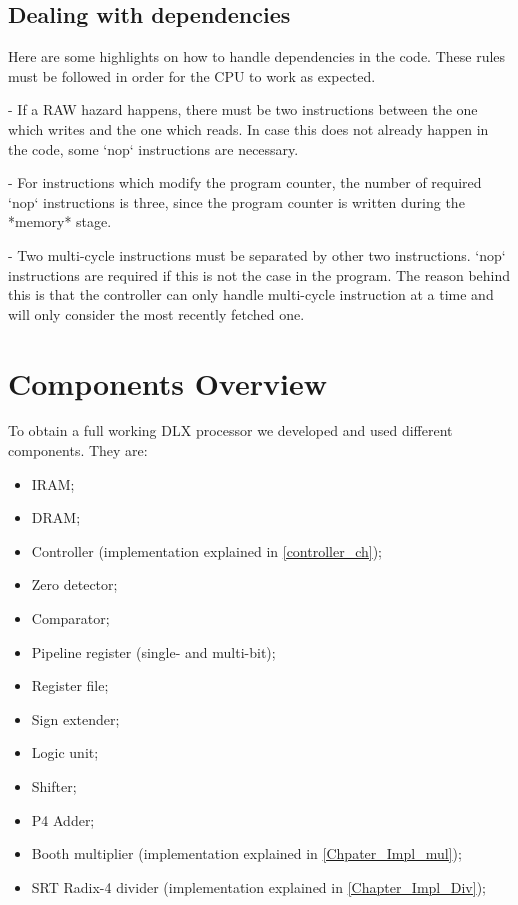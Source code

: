 \subsection{Dealing with dependencies}\label{dependencies}
\begin{markdown}    
Here are some highlights on how to handle dependencies in the code.
These rules must be followed in order for the CPU to work as expected.

- If a RAW hazard happens, there must be two instructions between the one which writes and the one which reads. In case this does not already happen in the code, some `nop` instructions are necessary.

- For instructions which modify the program counter, the number of required `nop` instructions is three, since the program counter is written during the *memory* stage.

- Two multi-cycle instructions must be separated by other two instructions. `nop` instructions are required if this is not the case in the program. The reason behind this is that the controller can only handle multi-cycle instruction at a time and will only consider the most recently fetched one.
\end{markdown}

\section{Components Overview}\label{components_overview}

To obtain a full working DLX processor we developed and used different components. They are:
\begin{itemize}
    \item IRAM;
\end{itemize}
    \begin{itemize}
        \item DRAM;
        \item Controller (implementation explained in \autoref{controller_ch});
        \item Zero detector;
        \item Comparator;
        \item Pipeline register (single- and multi-bit);
        \item Register file;
        \item Sign extender;
        \item Logic unit;
        \item Shifter;
        \item P4 Adder;
        \item Booth multiplier (implementation explained in \autoref{Chpater_Impl_mul});
        \item SRT Radix-4 divider (implementation explained in \autoref{Chapter_Impl_Div});
    \end{itemize}

